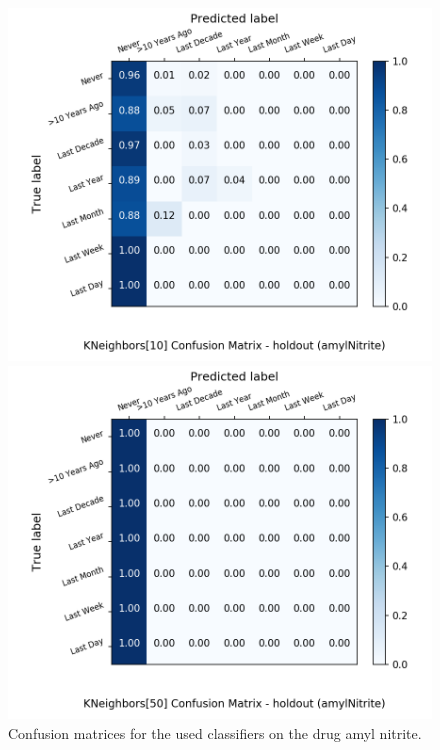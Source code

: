 \begin{figure}[H]
\begin{minipage}[b]{0.32\textwidth}
		\includegraphics[width=1.1\textwidth]{Plots/drugs/amylNitrite_KNeighbors_10_balance_False_holdout.png}
  \end{minipage}
	\begin{minipage}[b]{0.32\textwidth}
		\includegraphics[width=1.1\textwidth]{Plots/drugs/amylNitrite_KNeighbors_50_balance_False_holdout.png}
  \end{minipage}
	\caption{Confusion matrices for the used classifiers on the drug amyl nitrite.}
\end{figure}

